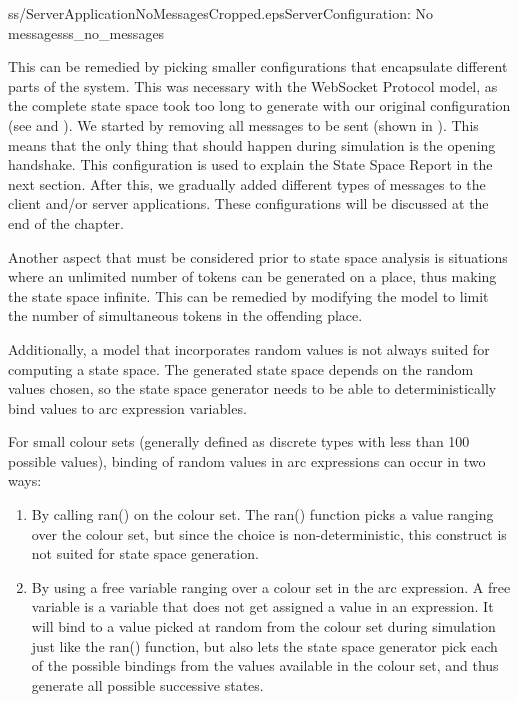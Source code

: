 		{ss/ServerApplicationNoMessagesCropped.eps}{Server}{Configuration:
		No messages}{ss_no_messages}
	
		This can be remedied by picking smaller configurations that encapsulate
		different parts of the system. This was necessary with the WebSocket Protocol
		model, as the complete state space took too long to generate with our
		original configuration (see  and ).
		We started by removing all messages to be sent (shown in
		).
		This means that the only thing that should happen during simulation is the
		opening handshake. This configuration is used to explain the State Space Report in
		the next section.
		After this, we gradually added different types of messages to the client
		and/or server applications. These configurations will be discussed at the end
		of the chapter.
		
		Another aspect that must be considered prior to state space analysis is
		situations where an unlimited number of tokens can be generated on a place,
		thus making the state space infinite. This can be remedied by modifying the model to
		limit the number of simultaneous tokens in the offending place.
		
		Additionally, a model that incorporates random values is not always suited
		for computing a state space. The generated state space depends on the random
		values chosen, so the state space generator needs to be able to
		deterministically bind values to arc expression variables.
				
		For small colour sets (generally defined as discrete types with less
		than 100 possible values), binding of random values in arc expressions can
		occur in two ways: 
		\begin{enumerate}
		\item By calling ran() on the colour set. The ran() function picks a value
		ranging over the colour set, but since the choice is non-deterministic,
		this construct is not suited for state space generation.
		\item By using a free variable ranging over a colour set in the arc expression.
		A free variable is a variable that does not get assigned a value in an expression. It will 
		bind to a value picked at random from the colour set during simulation just
		like the ran() function, but also lets the state space generator pick each of 
		the possible bindings from the values available in the colour set, and thus
		generate all possible successive states. 
		\end{enumerate}
		
